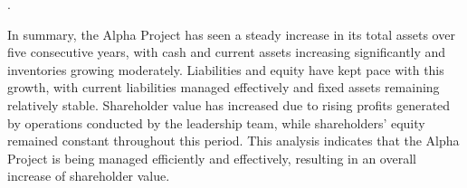 .

In summary, the Alpha Project has seen a steady increase in its total assets over five consecutive years, with cash and current assets increasing significantly and inventories growing moderately. Liabilities and equity have kept pace with this growth, with current liabilities managed effectively and fixed assets remaining relatively stable. Shareholder value has increased due to rising profits generated by operations conducted by the leadership team, while shareholders' equity remained constant throughout this period. This analysis indicates that the Alpha Project is being managed efficiently and effectively, resulting in an overall increase of shareholder value.